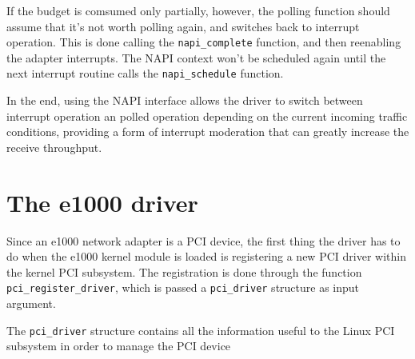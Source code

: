 If the budget is comsumed only partially, however, the polling function should assume that it's not worth polling again, and switches back
to interrupt operation. This is done calling the \texttt{napi\_complete} function, and then reenabling the adapter interrupts. The NAPI
context won't be scheduled again until the next interrupt routine calls the \texttt{napi\_schedule} function.

\vspace{0.5cm}

In the end, using the NAPI interface allows the driver to switch between interrupt operation an polled operation depending on the current
incoming traffic conditions, providing a form of interrupt moderation that can greatly increase the receive throughput.


\section{The e1000 driver}
Since an e1000 network adapter is a PCI device, the first thing the driver has to do when the e1000 kernel module is loaded is 
registering a new PCI driver within the kernel PCI subsystem. The registration is done through the function \texttt{pci\_register\_driver},
which is passed a \texttt{pci_driver} structure as input argument.

The \texttt{pci_driver} structure contains all the information useful to the Linux PCI subsystem in order to manage the PCI device